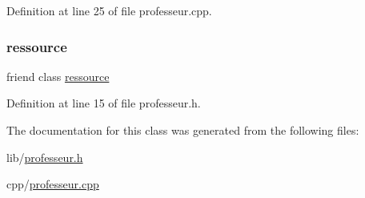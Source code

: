 Definition at line 25 of file professeur.\+cpp.

\hypertarget{classprofesseur_a24d55629351652ce27831ce9ef5194c9}{}\label{classprofesseur_a24d55629351652ce27831ce9ef5194c9} 
\subsubsection{\texorpdfstring{ressource}{ressource}}
{\footnotesize\ttfamily friend class \hyperlink{classressource}{ressource}\hspace{0.3cm}{\ttfamily [friend]}}



Definition at line 15 of file professeur.\+h.



The documentation for this class was generated from the following files\+:\begin{DoxyCompactItemize}
\item 
lib/\hyperlink{professeur_8h}{professeur.\+h}\item 
cpp/\hyperlink{professeur_8cpp}{professeur.\+cpp}\end{DoxyCompactItemize}
